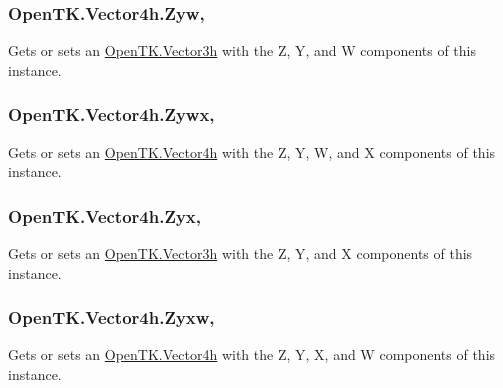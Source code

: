 \hypertarget{struct_open_t_k_1_1_vector4h_acead85b3a431b669721d2cac51f8dba1}{
\subsubsection[{Zyw}]{ Open\-T\-K.\-Vector4h.\-Zyw\hspace{0.3cm}{\ttfamily [get]}, {\ttfamily [set]}}}\label{struct_open_t_k_1_1_vector4h_acead85b3a431b669721d2cac51f8dba1}


Gets or sets an \hyperlink{struct_open_t_k_1_1_vector3h}{Open\-T\-K.\-Vector3h} with the Z, Y, and W components of this instance. 

\hypertarget{struct_open_t_k_1_1_vector4h_a1621f00cc69314f89abdccc003bc7246}{
\subsubsection[{Zywx}]{ Open\-T\-K.\-Vector4h.\-Zywx\hspace{0.3cm}{\ttfamily [get]}, {\ttfamily [set]}}}\label{struct_open_t_k_1_1_vector4h_a1621f00cc69314f89abdccc003bc7246}


Gets or sets an \hyperlink{struct_open_t_k_1_1_vector4h}{Open\-T\-K.\-Vector4h} with the Z, Y, W, and X components of this instance. 

\hypertarget{struct_open_t_k_1_1_vector4h_a7f554929725ef749433a3f9034ad6c9e}{
\subsubsection[{Zyx}]{ Open\-T\-K.\-Vector4h.\-Zyx\hspace{0.3cm}{\ttfamily [get]}, {\ttfamily [set]}}}\label{struct_open_t_k_1_1_vector4h_a7f554929725ef749433a3f9034ad6c9e}


Gets or sets an \hyperlink{struct_open_t_k_1_1_vector3h}{Open\-T\-K.\-Vector3h} with the Z, Y, and X components of this instance. 

\hypertarget{struct_open_t_k_1_1_vector4h_ab77defecbae32f13f5a0df6dfc1d3880}{
\subsubsection[{Zyxw}]{ Open\-T\-K.\-Vector4h.\-Zyxw\hspace{0.3cm}{\ttfamily [get]}, {\ttfamily [set]}}}\label{struct_open_t_k_1_1_vector4h_ab77defecbae32f13f5a0df6dfc1d3880}


Gets or sets an \hyperlink{struct_open_t_k_1_1_vector4h}{Open\-T\-K.\-Vector4h} with the Z, Y, X, and W components of this instance. 

